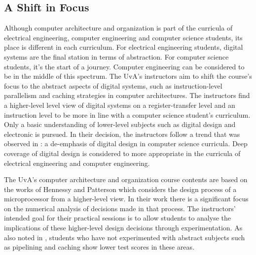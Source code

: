 \documentclass[openright]{template/uva-bachelor-thesis}
\begin{document}




\subsection{A Shift in Focus}
Although computer architecture and organization is part of the curricula of electrical engineering, computer engineering and computer science students, its place is different in each curriculum. 
For electrical engineering students, digital systems are the final station in terms of abstraction. For computer science students, it's the start of a journey. Computer engineering can be considered to be in the middle of this spectrum. The UvA's instructors aim to shift the course's focus to the abstract aspects of digital systems, such as instruction-level parallelism and caching strategies in computer architectures. The instructors find a higher-level level view of digital systems on a register-transfer level and an instruction level to be more in line with a computer science student's curriculum. Only a basic understanding of lower-level subjects such as digital design and electronic is pursued. In their decision, the instructors follow a trend that was observed in \cite[p. 205]{cs2013final}: a de-emphasis of digital design in computer science curricula. Deep coverage of digital design is considered to more appropriate in the curricula of electrical engineering and computer engineering. 


The UvA's computer architecture and organization course contents are based on the works of Hennessy and Patterson \cite{hennessy2013computer} which considers the design process of a microprocessor from a higher-level view. In their work there is a significant focus on the numerical analysis of decisions made in that process. The instructors' intended goal for their practical sessions is to allow students to analyse the implications of these higher-level design decisions through experimentation. As also noted in \cite{paharsingh2009novel}, students who have not experimented with abstract subjects such as pipelining and caching show lower test scores in these areas. 
\end{document}
